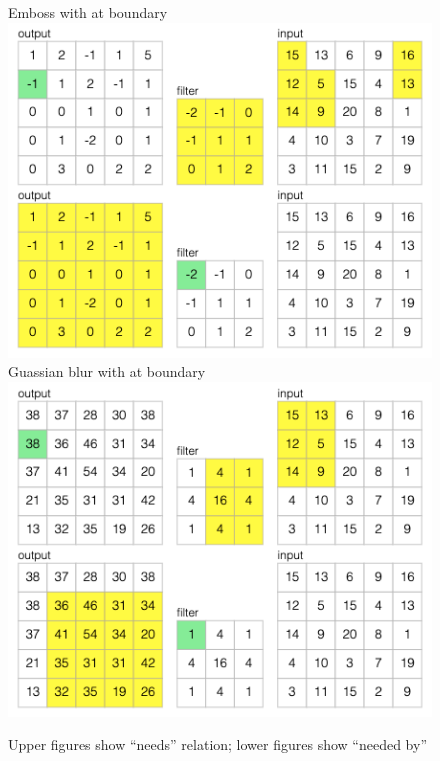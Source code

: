 \begin{figure}[H]
   \subcaptionbox
      {Emboss with  at boundary}
      {\includegraphics[scale=0.4]{fig/example/conv-wrap.png}}
   \subcaptionbox
      {Guassian blur with  at boundary}
      {\includegraphics[scale=0.4]{fig/example/conv-zero.png}}
   \caption{Upper figures show ``needs'' relation; lower figures show ``needed by''}
\end{figure}
